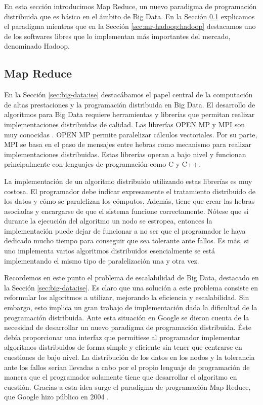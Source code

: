 \documentclass[10pt]{article}
\begin{document}
	En esta sección introducimos Map Reduce, un nuevo paradigma de programación distribuida que es básico en el ámbito de Big Data. En la Sección \ref{sec:mr-hadoop:map-reduce} explicamos el paradigma mientras que en la Sección \ref{sec:mr-hadoop:hadoop} destacamos uno de los softwares libres que lo implementan más importantes del mercado, denominado Hadoop.

	\subsection{Map Reduce} \label{sec:mr-hadoop:map-reduce}

		En la Sección \ref{sec:big-data:ise} destacábamos el papel central de la computación de altas prestaciones y la programación distribuida en Big Data. El desarrollo de algoritmos para Big Data requiere herramientas y librerías que permitan realizar implementaciones distribuidas de calidad. Las librerías OPEN MP y MPI son muy conocidas \cite{openmpmpi, openmp}. OPEN MP permite paralelizar cálculos vectoriales. Por su parte, MPI se basa en el paso de mensajes entre hebras como mecanismo para realizar implementaciones distribuidas. Estas librerías operan a bajo nivel y funcionan principalmente con lenguajes de programación como C y C++. 
		
		La implementación de un algoritmo distribuido utilizando estas librerías es muy costosa. El programador debe indicar expresamente el tratamiento distribuido de los datos y cómo se paralelizan los cómputos. Además, tiene que crear las hebras asociadas y encargarse de que el sistema funcione correctamente. Nótese que si durante la ejecución del algoritmo un nodo se estropea, entonces la implementación puede dejar de funcionar a no ser que el programador le haya dedicado mucho tiempo para conseguir que sea tolerante ante fallos. Es más, si uno implementa varios algoritmos distribuidos esencialmente se está implementando el mismo tipo de paralelización una y otra vez.
	
		Recordemos en este punto el problema de escalabilidad de Big Data, destacado en la Sección \ref{sec:big-data:ise}. Es claro que una solución a este problema consiste en reformular los algoritmos a utilizar, mejorando la eficiencia y escalabilidad. Sin embargo, esto implica un gran trabajo de implementación dada la dificultad de la programación distribuida. Ante esta situación en Google se dieron cuenta de la necesidad de desarrollar un nuevo paradigma de programación distribuida. Éste debía proporcionar una interfaz que permitiese al programador implementar algoritmos distribuidos de forma simple y eficiente sin tener que centrarse en cuestiones de bajo nivel. La distribución de los datos en los nodos y la tolerancia ante los fallos serían llevadas a cabo por el propio lenguaje de programación de manera que el programador solamente tiene que desarrollar el algoritmo en cuestión. Gracias a esta idea surge el paradigma de programación Map Reduce, que Google hizo público en 2004 \cite{map-reduce1, map-reduce2, map-reduce3}.
	
\end{document}
